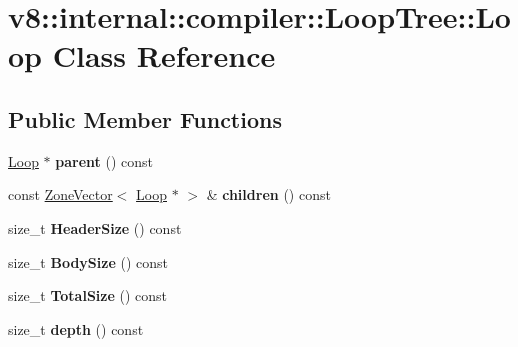 \hypertarget{classv8_1_1internal_1_1compiler_1_1_loop_tree_1_1_loop}{}\section{v8\+:\+:internal\+:\+:compiler\+:\+:Loop\+Tree\+:\+:Loop Class Reference}
\label{classv8_1_1internal_1_1compiler_1_1_loop_tree_1_1_loop}
\subsection*{Public Member Functions}
\begin{DoxyCompactItemize}
\item 
\hyperlink{classv8_1_1internal_1_1compiler_1_1_loop_tree_1_1_loop}{Loop} $\ast$ {\bfseries parent} () const \hypertarget{classv8_1_1internal_1_1compiler_1_1_loop_tree_1_1_loop_a7ed099ef43cdd452794e8ee4f7c026e7}{}\label{classv8_1_1internal_1_1compiler_1_1_loop_tree_1_1_loop_a7ed099ef43cdd452794e8ee4f7c026e7}

\item 
const \hyperlink{classv8_1_1internal_1_1_zone_vector}{Zone\+Vector}$<$ \hyperlink{classv8_1_1internal_1_1compiler_1_1_loop_tree_1_1_loop}{Loop} $\ast$ $>$ \& {\bfseries children} () const \hypertarget{classv8_1_1internal_1_1compiler_1_1_loop_tree_1_1_loop_ad3e8e1b30548ce3490aad5c581e833cc}{}\label{classv8_1_1internal_1_1compiler_1_1_loop_tree_1_1_loop_ad3e8e1b30548ce3490aad5c581e833cc}

\item 
size\+\_\+t {\bfseries Header\+Size} () const \hypertarget{classv8_1_1internal_1_1compiler_1_1_loop_tree_1_1_loop_a33cc24635c44f95e4ceaffe63a511883}{}\label{classv8_1_1internal_1_1compiler_1_1_loop_tree_1_1_loop_a33cc24635c44f95e4ceaffe63a511883}

\item 
size\+\_\+t {\bfseries Body\+Size} () const \hypertarget{classv8_1_1internal_1_1compiler_1_1_loop_tree_1_1_loop_a621ac6fc0df8db8e0c544a1d19e25533}{}\label{classv8_1_1internal_1_1compiler_1_1_loop_tree_1_1_loop_a621ac6fc0df8db8e0c544a1d19e25533}

\item 
size\+\_\+t {\bfseries Total\+Size} () const \hypertarget{classv8_1_1internal_1_1compiler_1_1_loop_tree_1_1_loop_a199daca720b00e41dd218500cd0094b0}{}\label{classv8_1_1internal_1_1compiler_1_1_loop_tree_1_1_loop_a199daca720b00e41dd218500cd0094b0}

\item 
size\+\_\+t {\bfseries depth} () const \hypertarget{classv8_1_1internal_1_1compiler_1_1_loop_tree_1_1_loop_a48e85acda4b814a5d50ef55742bd1d7f}{}\label{classv8_1_1internal_1_1compiler_1_1_loop_tree_1_1_loop_a48e85acda4b814a5d50ef55742bd1d7f}

\end{DoxyCompactItemize}
